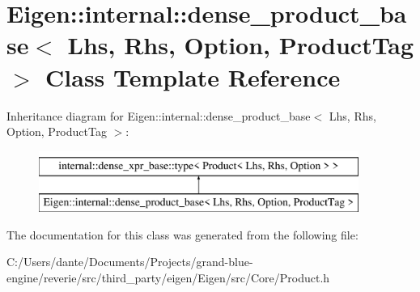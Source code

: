 \hypertarget{class_eigen_1_1internal_1_1dense__product__base}{}\section{Eigen\+::internal\+::dense\+\_\+product\+\_\+base$<$ Lhs, Rhs, Option, Product\+Tag $>$ Class Template Reference}
\label{class_eigen_1_1internal_1_1dense__product__base}
Inheritance diagram for Eigen\+::internal\+::dense\+\_\+product\+\_\+base$<$ Lhs, Rhs, Option, Product\+Tag $>$\+:\begin{figure}[H]
\begin{center}
\leavevmode
\includegraphics[height=2.000000cm]{class_eigen_1_1internal_1_1dense__product__base}
\end{center}
\end{figure}


The documentation for this class was generated from the following file\+:\begin{DoxyCompactItemize}
\item 
C\+:/\+Users/dante/\+Documents/\+Projects/grand-\/blue-\/engine/reverie/src/third\+\_\+party/eigen/\+Eigen/src/\+Core/Product.\+h\end{DoxyCompactItemize}
